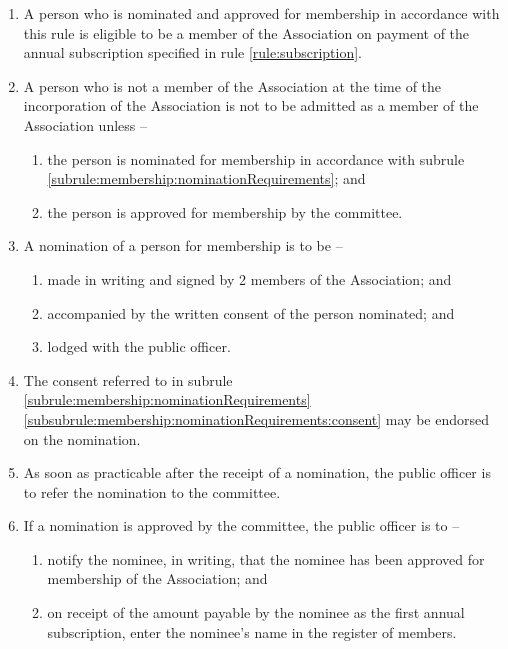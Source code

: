 \documentclass[a4paper,11pt]{article}
\begin{document}
\begin{enumerate}
	\item A person who is nominated and approved for membership in accordance with this rule is eligible to be a member of the Association on payment of the annual subscription specified in rule \ref{rule:subscription}.
	
	\item A person who is not a member of the Association at the time of the incorporation of the Association is not to be admitted as a member of the Association unless --
	\begin{enumerate}
		\item the person is nominated for membership in accordance with subrule \ref{subrule:membership:nominationRequirements}; and
		\item the person is approved for membership by the committee.
	\end{enumerate}
	
	\item \label{subrule:membership:nominationRequirements} A nomination of a person for membership is to be --
	\begin{enumerate}
		\item made in writing and signed by 2 members of the Association; and
		\item \label{subsubrule:membership:nominationRequirements:consent} accompanied by the written consent of the person nominated; and
		\item lodged with the public officer.
	\end{enumerate}
	
	\item The consent referred to in subrule \ref{subrule:membership:nominationRequirements}\ref{subsubrule:membership:nominationRequirements:consent} may be endorsed on the nomination.
	\item As soon as practicable after the receipt of a nomination, the public officer is to refer the nomination to the committee.
	
	\item If a nomination is approved by the committee, the public officer is to --
	\begin{enumerate}
		\item notify the nominee, in writing, that the nominee has been approved for membership of the Association; and
		\item on receipt of the amount payable by the nominee as the first annual subscription, enter the nominee's name in the register of members.
	\end{enumerate}
	

\end{enumerate}
\end{document}
